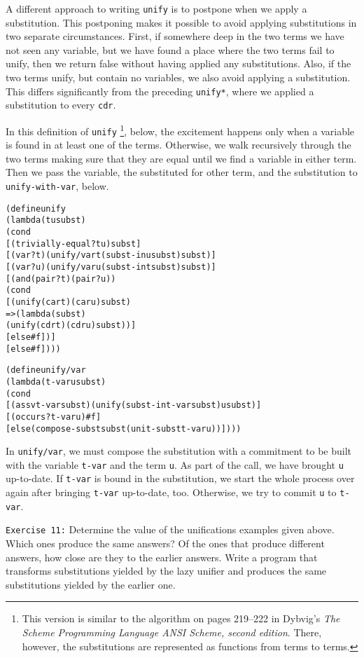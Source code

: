 A different approach to writing \texttt{unify} is to postpone when we
apply a substitution.  This postponing makes it possible to avoid
applying substitutions in two separate circumstances.  First, if
somewhere deep in the two terms we have not seen any variable, but we
have found a place where the two terms fail to unify, then we return
false without having applied any substitutions.  Also, if the two
terms unify, but contain no variables, we also avoid applying a
substitution.  This differs significantly from the preceding
\texttt{unify*}, where we applied a substitution to every
\texttt{cdr}.

In this definition of \texttt{unify}
\footnote{This version is similar to the algorithm on pages 219--222 in Dybvig's
\emph{The Scheme Programming Language ANSI Scheme, second edition}. There,
however, the substitutions are represented as functions from terms to
terms.}, below, the excitement happens only when a variable is found in at
least one of the terms.  Otherwise, we walk recursively through the two
terms making sure that they are equal until we find a variable in either
term. Then we pass the variable, the substituted for other term, and
the substitution to \texttt{unify-with-var}, below.

\begin{alltt}
(define unify
  (lambda (t u subst)
    (cond
      [(trivially-equal? t u) subst]
      [(var? t) (unify/var t (subst-in u subst) subst)]
      [(var? u) (unify/var u (subst-in t subst) subst)]
      [(and (pair? t) (pair? u))
       (cond
         [(unify (car t) (car u) subst)
          => (lambda (subst)
               (unify (cdr t) (cdr u) subst))]
         [else #f])]
      [else #f])))
\end{alltt}
\newpage
\begin{alltt}
(define unify/var
  (lambda (t-var u subst)
    (cond
      [(assv t-var subst) (unify (subst-in t-var subst) u subst)]
      [(occurs? t-var u) #f]
      [else (compose-subst subst (unit-subst t-var u))])))
\end{alltt}

In \texttt{unify/var}, we must compose the substitution with a
commitment to be built with the variable \texttt{t-var} and the term
\texttt{u}.  As part of the call, we have brought \texttt{u}
up-to-date.  If \texttt{t-var} is bound in the substitution, we start
the whole process over again after bringing \texttt{t-var} up-to-date,
too.  Otherwise, we try to commit \texttt{u} to \texttt{t-var}.

\texttt{Exercise 11:} Determine the value of the unifications examples
given above.  Which ones produce the same answers?  Of the ones that
produce different answers, how close are they to the earlier answers.
Write a program that transforms substitutions yielded by the lazy
unifier and produces the same substitutions yielded by the earlier
one.
